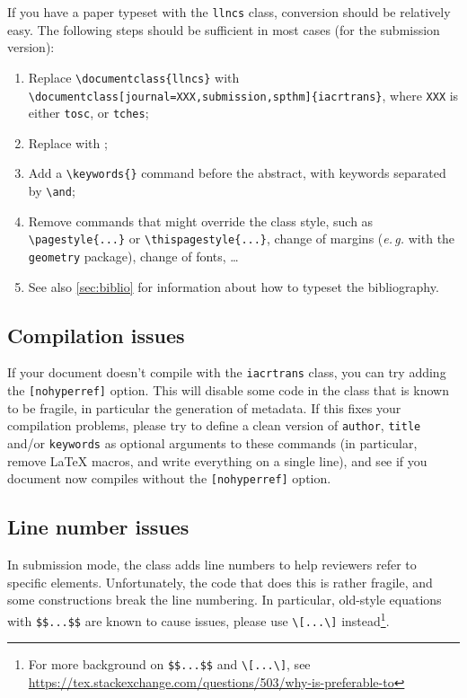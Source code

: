 \documentclass{iacrtrans}
\begin{document}
If you have a paper typeset with the \texttt{llncs} class, conversion
should be relatively easy.  The following steps should be sufficient
in most cases (for the submission version):
\begin{enumerate}
\item Replace \verb+\documentclass{llncs}+ with\\
    \verb+\documentclass[journal=XXX,submission,spthm]{iacrtrans}+,
    where \verb+XXX+ is either \verb+tosc+, or \verb+tches+;
\item Replace \verb++ with
  \verb++;
\item Add a \verb+\keywords{}+ command before the abstract, with
  keywords separated by \verb+\and+;
\item Remove commands that might override the class style, such as
  \verb+\pagestyle{...}+ or \verb+\thispagestyle{...}+,
  change of margins (\emph{e.\,g.}  with the \texttt{geometry} package),
  change of fonts, \ldots
\item See also \autoref{sec:biblio} for information about how to
  typeset the bibliography.
\end{enumerate}


\subsection{Compilation issues}

If your document doesn't compile with the \texttt{iacrtrans} class,
you can try adding the \texttt{[nohyperref]} option.  This will
disable some code in the class that is known to be fragile, in
particular the generation of metadata.  If this fixes your compilation
problems, please try to define a clean version of \texttt{author},
\texttt{title} and/or \texttt{keywords} as optional arguments to
these commands (in particular, remove \LaTeX{}  macros, and write
everything on a single line), and see if you document now compiles
without the \texttt{[nohyperref]} option.

\subsection{Line number issues}

In submission mode, the class adds line numbers to help reviewers refer
to specific elements.  Unfortunately, the code that does this is rather
fragile, and some constructions break the line numbering.  In
particular, old-style equations with \verb+$$...$$+ are known to cause
issues, please use \verb+\[...\]+ instead\footnote{For more background
  on \texttt{\$\$...\$\$} and \texttt{\textbackslash[...\textbackslash]},
  see \url{https://tex.stackexchange.com/questions/503/why-is-preferable-to}}.
\end{document}
